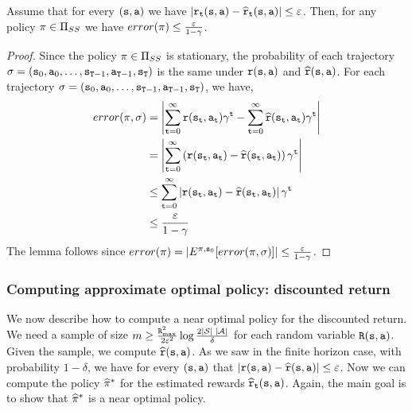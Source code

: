 \begin{lemma}
\label{lemma:approx-disc-error}
%
Assume that for every $({\tt s},{\tt a})$ we have
$|{\tt r}_{\tt t}({\tt s},{\tt a})-\widehat{{\tt r}}_{\tt t}({\tt s},{\tt a})|\leq
\varepsilon$. Then, for any policy $\pi\in {\Pi _{SS}}$ we have
$error(\pi)\leq \frac{\varepsilon}{1-\gamma}$.
\end{lemma}

\begin{proof}
Since the policy $\pi\in {\Pi _{SS}}$ is stationary, the
probability of each trajectory $\sigma=({\tt s}_0,{\tt a}_0,\ldots,
{\tt s}_{{\tt T}-1},{\tt a}_{{\tt T}-1},{\tt s}_{\tt T})$ is the
same under ${\tt r}({\tt s},{\tt a})$ and
$\widehat{{\tt r}}({\tt s},{\tt a})$. For each trajectory
$\sigma=({\tt s}_0,{\tt a}_0,\ldots,
{\tt s}_{{\tt T}-1},{\tt a}_{{\tt T}-1},{\tt s}_{\tt T})$, we
have,
\begin{align*}
error(\pi,\sigma)&=\left|\sum_{{\tt t}=0}^\infty
{\tt r}({\tt s}_{\tt t},{\tt a}_{\tt t})\gamma^{\tt t}
-\sum_{{\tt t}=0}^\infty
\widehat{{\tt r}}({\tt s}_{\tt t},{\tt a}_{\tt t})\gamma^{\tt t} \right| \\
&= \left|\sum_{{\tt t}=0}^\infty \left({\tt r}({\tt s}_{\tt t},{\tt a}_{\tt t})-\widehat{{\tt r}}({\tt s}_{\tt t},{\tt a}_{\tt t})\right)\gamma^{\tt t} \right|\\
&\leq \sum_{{\tt t}=0}^\infty \left|{\tt r}({\tt s}_{\tt t},{\tt a}_{\tt t})-\widehat{{\tt r}}({\tt s}_{\tt t},{\tt a}_{\tt t})\right|\gamma^{\tt t} \\
&\leq \frac{\varepsilon}{1-\gamma}
\end{align*}
The lemma follows since
$error(\pi)=|E^{\pi,{\tt s}_0}[error(\pi,\sigma)]|\leq
\frac{\varepsilon}{1-\gamma}$.
\end{proof}

\subsubsection{Computing approximate optimal policy: discounted return}

We now describe how to compute a near optimal policy for the
discounted return.
We need a sample of size $m\geq \frac{{\tt R}_{\max }^2}{2\varepsilon^2}\log
\frac{2|\mathcal{S}|\;|\mathcal{A}|}{\delta}$ for each random variable
${\tt R}({\tt s},{\tt a})$. Given the sample, we compute
$\widehat{{\tt r}}({\tt s},{\tt a})$. As we saw in the finite horizon
case, with probability $1-\delta$, we have for every
$({\tt s},{\tt a})$ that
$|{\tt r}({\tt s},{\tt a})-\widehat{{\tt r}}({\tt s},{\tt a})|\leq
\varepsilon$. Now we can compute the policy $\widehat{\pi}^*$
for the estimated rewards
$\widehat{{\tt r}}_{\tt t}({\tt s},{\tt a})$. Again, the main goal is
to show that $\widehat{\pi}^*$ is a near optimal policy.

